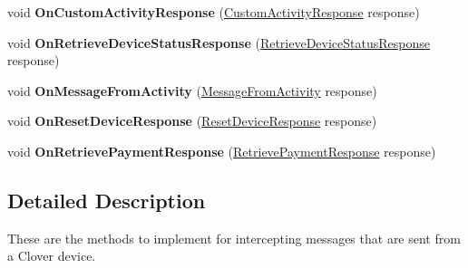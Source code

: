 \begin{DoxyCompactItemize}
\mbox{\label{interfacecom_1_1clover_1_1remotepay_1_1sdk_1_1_i_clover_connector_listener_aee5ad989a0eeb2dea5149a212ca94488}} 
void {\bfseries On\+Custom\+Activity\+Response} (\hyperlink{classcom_1_1clover_1_1remotepay_1_1sdk_1_1_custom_activity_response}{Custom\+Activity\+Response} response)
\item 
\mbox{\label{interfacecom_1_1clover_1_1remotepay_1_1sdk_1_1_i_clover_connector_listener_a2ce59dcc916f95bcb88f9e25deccd92f}} 
void {\bfseries On\+Retrieve\+Device\+Status\+Response} (\hyperlink{classcom_1_1clover_1_1remotepay_1_1sdk_1_1_retrieve_device_status_response}{Retrieve\+Device\+Status\+Response} response)
\item 
\mbox{\label{interfacecom_1_1clover_1_1remotepay_1_1sdk_1_1_i_clover_connector_listener_aae1ff245e0722b012a8cdcb5e7310610}} 
void {\bfseries On\+Message\+From\+Activity} (\hyperlink{classcom_1_1clover_1_1remotepay_1_1sdk_1_1_message_from_activity}{Message\+From\+Activity} response)
\item 
\mbox{\label{interfacecom_1_1clover_1_1remotepay_1_1sdk_1_1_i_clover_connector_listener_aa3c9d76aad1d434a7ca72276c0b9c1eb}} 
void {\bfseries On\+Reset\+Device\+Response} (\hyperlink{classcom_1_1clover_1_1remotepay_1_1sdk_1_1_reset_device_response}{Reset\+Device\+Response} response)
\item 
\mbox{\label{interfacecom_1_1clover_1_1remotepay_1_1sdk_1_1_i_clover_connector_listener_a80b66ca256c60f88d9c3bc1bf7df1a25}} 
void {\bfseries On\+Retrieve\+Payment\+Response} (\hyperlink{classcom_1_1clover_1_1remotepay_1_1sdk_1_1_retrieve_payment_response}{Retrieve\+Payment\+Response} response)
\end{DoxyCompactItemize}


\subsection{Detailed Description}
These are the methods to implement for intercepting messages that are sent from a Clover device. 



